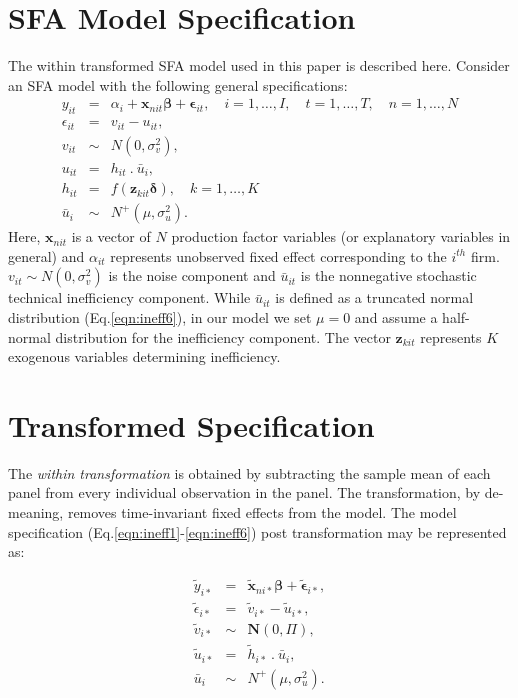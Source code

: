 \section{SFA Model Specification}
\noindent The within transformed SFA model \citep{Wang2010} used in this paper is described here. Consider an SFA model with the following general specifications$:$
\begin{eqnarray}
y_{it} & = &\alpha_{i}+\mathbf{x}_{nit}\boldsymbol\beta+\mathbf{\epsilon}_{it},
\hspace{1em} i=1,\ldots,I,\hspace{1em}t=1,\ldots,T,\hspace{1em}n=1,\ldots,N
\label{eqn:ineff1}\\
\epsilon_{it} & = &v_{it} - u_{it},\\
v_{it} &\sim& N(0,\sigma_{v}^{2}),\\
u_{it} &=& h_{it}~.~\bar{u}_{i},\\
h_{it} &=& f(\mathbf{z}_{kit}\mathbf{\delta}),\hspace{1em}k=1,\ldots,K\\
\bar{u}_{i} &\sim& N^{+}(\mu,\sigma_{u}^{2}).\label{eqn:ineff6}
\end{eqnarray}
Here, $\mathbf{x}_{nit}$ is a vector of $N$ production factor variables (or explanatory variables in general) and $\alpha_{it}$ represents unobserved fixed effect corresponding to the $i^{th}$ firm. $v_{it}\sim N(0,\sigma_{v}^{2})$ is the noise component and $\bar{u}_{it}$ 
is the nonnegative stochastic technical inefficiency component. While $\bar{u}_{it}$ is defined as a truncated normal distribution (Eq.\ref{eqn:ineff6}), in our model we set $\mu=0$ and assume a half-normal distribution for the inefficiency component. The vector $\mathbf{z}_{kit}$ represents $K$ exogenous variables determining inefficiency. 

\section{Transformed Specification}
The \emph{within transformation} is obtained by subtracting the sample mean of each panel
from every individual observation in the panel. The transformation, by de-meaning, removes
time-invariant fixed effects from the model. The model specification (Eq.\ref{eqn:ineff1}-\ref{eqn:ineff6}) post transformation may be represented as$:$

\begin{eqnarray}
\tilde{y}_{i*} & = &\mathbf{\tilde{x}}_{ni*}\boldsymbol\beta+\mathbf{\tilde{\epsilon}}_{i*},
\label{eqn:tineff1}\\
\tilde{\epsilon}_{i*} & = &\tilde{v}_{i*} - \tilde{u}_{i*},\\
\tilde{v}_{i*} &\sim& \mathbf{N}(0,\Pi),\label{eqn:tineff3}\\
\tilde{u}_{i*} &=& \tilde{h}_{i*}~.~\bar{u}_{i},\\
\bar{u}_{i} &\sim& N^{+}(\mu,\sigma_{u}^{2}).\label{eqn:tineff5}
\end{eqnarray}

